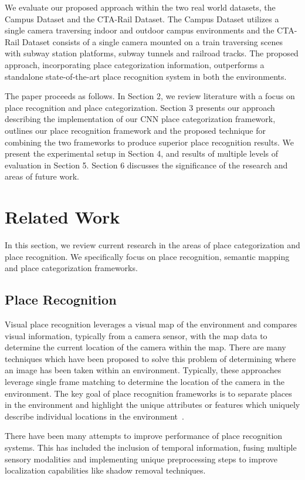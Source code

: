 \documentclass[letterpaper, 10 pt, conference]{ieeeconf}  %
\begin{document}
We evaluate our proposed approach within the two real world datasets, the Campus Dataset and the CTA-Rail Dataset. The Campus Dataset utilizes a single camera traversing indoor and outdoor campus environments and the CTA-Rail Dataset consists of a single camera mounted on a train traversing scenes with subway station platforms, subway tunnels and railroad tracks. The proposed approach, incorporating place categorization information,  outperforms a standalone state-of-the-art place recognition system in both the environments.  

The paper proceeds as follows. In Section 2, we review literature with a focus on place recognition and place categorization. Section 3 presents our approach describing the implementation of our CNN place categorization framework, outlines our place recognition framework and the proposed technique for combining the two frameworks to produce superior place recognition results. We present the experimental setup in Section 4, and results of multiple levels of evaluation in Section 5. Section 6 discusses the significance of the research and areas of future work.

\section{Related Work}
In this section, we review current research in the areas of place categorization and place recognition. We specifically focus on place recognition, semantic mapping and place categorization frameworks. 

\subsection{Place Recognition}
Visual place recognition leverages a visual map of the environment and compares visual information, typically from a camera sensor, with the map data to determine the current location of the camera within the map. There are many techniques which have been proposed to solve this problem of determining where an image has been taken within an environment. Typically, these approaches leverage single frame matching to determine the location of the camera in the environment. The key goal of place recognition frameworks is to separate places in the environment and highlight the unique attributes or features which uniquely describe individual locations in the environment~\cite{Cummins2009,nister2006scalable}. 

There have been many attempts to improve performance of place recognition systems. This has included the inclusion of temporal information, fusing multiple sensory modalities and implementing unique preprocessing steps to improve localization capabilities like shadow removal techniques. 
\end{document}
